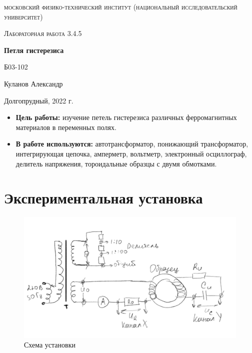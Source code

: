 \documentclass[a4paper, 12pt]{article}
\begin{document}
\begin{titlepage}
	\centering
	\vspace{5cm}
	{\scshape\LARGE московский физико-технический институт (национальный исследовательский университет) \par}
	\vspace{6cm}
	{\scshape\Large Лабораторная работа 3.4.5 \par}
	{\huge\bfseries Петля гистерезиса \par}
	\vspace{1cm}
	\vfill
\begin{flushright}
	{\large Б03-102}\par
	\vspace{0.3cm}
	{\LARGE Куланов Александр}
\end{flushright}
	

	\vfill


	Долгопрудный, 2022 г.
\end{titlepage}

\begin{itemize}
	\item \textbf{Цель работы:} изучение петель гистерезиса различных ферромагнитных материалов в переменных полях.
    \item \textbf{В работе используются:} автотрансформатор, понижающий трансформатор, интегрирующая цепочка, амперметр, 
    вольтметр, электронный осциллограф, делитель напряжения, тороидальные образцы с двумя обмотками.
\end{itemize}

\section{Экспериментальная установка}

\begin{figure}[h]
    \centering
    \includegraphics[width=1\textwidth]{set}
    \caption{Схема установки}
    \label{fig:set}
\end{figure}
\end{document}
